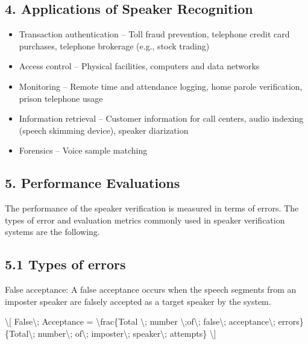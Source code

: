\documentclass[letterpaper,10pt,english]{jupyterBook}
\begin{document}
\subsection{4. Applications of Speaker Recognition}
\label{\detokenize{Recognition/Speaker_Recognition_and_Verification:applications-of-speaker-recognition}}\begin{itemize}
\item {} 
\sphinxAtStartPar
Transaction authentication – Toll fraud prevention, telephone credit
card purchases, telephone brokerage (e.g., stock trading)

\item {} 
\sphinxAtStartPar
Access control – Physical facilities, computers and data networks

\item {} 
\sphinxAtStartPar
Monitoring – Remote time and attendance logging, home parole
verification, prison telephone usage

\item {} 
\sphinxAtStartPar
Information retrieval – Customer information for call centers, audio
indexing (speech skimming device), speaker diarization

\item {} 
\sphinxAtStartPar
Forensics – Voice sample matching

\end{itemize}


\subsection{5. Performance Evaluations}
\label{\detokenize{Recognition/Speaker_Recognition_and_Verification:performance-evaluations}}
\sphinxAtStartPar
The performance of the speaker verification is measured in terms of
errors. The types of error and evaluation metrics commonly used in
speaker verification systems are the following.


\subsection{5.1 Types of errors}
\label{\detokenize{Recognition/Speaker_Recognition_and_Verification:types-of-errors}}
\sphinxAtStartPar
False acceptance: A false acceptance occurs when the speech segments
from an imposter speaker are falsely accepted as a target speaker by the
system.

\sphinxAtStartPar
\textbackslash{}{[} False\textbackslash{}; Acceptance = \textbackslash{}frac\{Total \textbackslash{}; number \textbackslash{};of\textbackslash{}; false\textbackslash{};
acceptance\textbackslash{}; errors\} \{Total\textbackslash{}; number\textbackslash{}; of\textbackslash{}; imposter\textbackslash{}; speaker\textbackslash{};
attempts\} \textbackslash{}{]}
\end{document}
